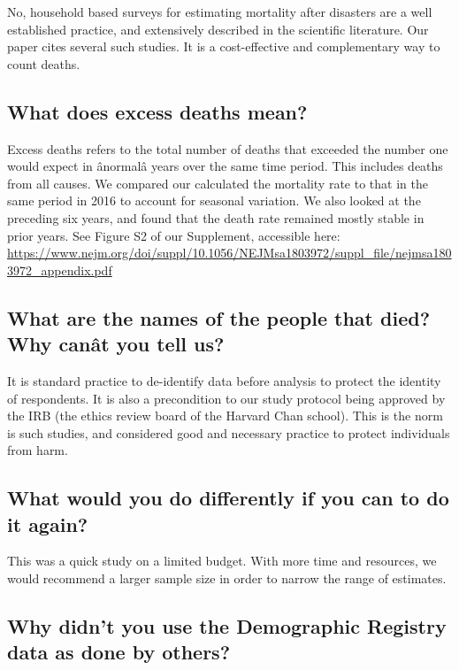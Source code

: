 \documentclass[]{article}
\begin{document}
No, household based surveys for estimating mortality after disasters are
a well established practice, and extensively described in the scientific
literature. Our paper cites several such studies. It is a cost-effective
and complementary way to count deaths.

\subsection{What does excess deaths
mean?}\label{what-does-excess-deaths-mean}

Excess deaths refers to the total number of deaths that exceeded the
number one would expect in ânormalâ years over the same time period.
This includes deaths from all causes. We compared our calculated the
mortality rate to that in the same period in 2016 to account for
seasonal variation. We also looked at the preceding six years, and found
that the death rate remained mostly stable in prior years. See Figure S2
of our Supplement, accessible here:
\url{https://www.nejm.org/doi/suppl/10.1056/NEJMsa1803972/suppl_file/nejmsa1803972_appendix.pdf}

\subsection{What are the names of the people that died? Why canât you
tell
us?}\label{what-are-the-names-of-the-people-that-died-why-canat-you-tell-us}

It is standard practice to de-identify data before analysis to protect
the identity of respondents. It is also a precondition to our study
protocol being approved by the IRB (the ethics review board of the
Harvard Chan school). This is the norm is such studies, and considered
good and necessary practice to protect individuals from harm.

\subsection{What would you do differently if you can to do it
again?}\label{what-would-you-do-differently-if-you-can-to-do-it-again}

This was a quick study on a limited budget. With more time and
resources, we would recommend a larger sample size in order to narrow
the range of estimates.

\subsection{Why didn't you use the Demographic Registry data as done by
others?}\label{why-didnt-you-use-the-demographic-registry-data-as-done-by-others}
\end{document}

